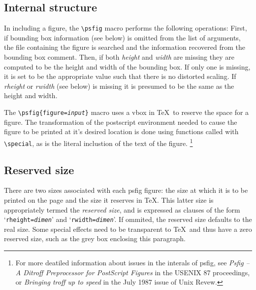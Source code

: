 \subsection{Internal structure}
In including a figure, the {\tt \verb+\psfig+} macro performs the following
operations:
First, if bounding box information (see below) is omitted from the list
of arguments, the
file containing the figure
is searched and the information recovered from the bounding box
comment. Then,
if both {\it height} and {\it width} are missing they are computed to
be the height and width of the bounding box. If only one is missing,
it is set to be the appropriate value such that there is no distorted
scaling.
If {\it rheight} or {\it rwidth} (see below) is missing it is presumed to
be the same as the height and width.
\par
The {\tt\verb+\+psfig\{figure={\it input}\}} macro
uses a vbox in \TeX\ to reserve the space for a figure.
The transformation of the postscript environment needed to
cause the figure to be printed at it's desired location is 
done using \Ps functions called with 
{\tt \verb+\+special}, as is the literal inclustion of the
text of the figure.
\footnote[2]{For more deatiled information about \Ps issues in the
interals of psfig, see {\it Psfig -- A Ditroff Preprocessor for
PostScript Figures} in the USENIX 87 proceedings, or {\it Bringing
troff up to speed} in the July 1987 issue of Unix Revew.}
\par
\subsection{Reserved size}
\par
There are two sizes associated with each psfig figure: the size
at which it is to be printed on the page
and the size it reserves in \TeX. This latter size is appropriately
termed the {\it reserved size}, and is expressed as clauses of the form
`{\small\tt rheight={\it dimen}}'
and `{\tt rwidth={\it dimen}}'. If ommited, the reserved size defaults
to the real size. Some special effects need to be transparent
to \TeX\ and thus have a zero reserved size, such as the grey
box enclosing
this paragraph.
\par
